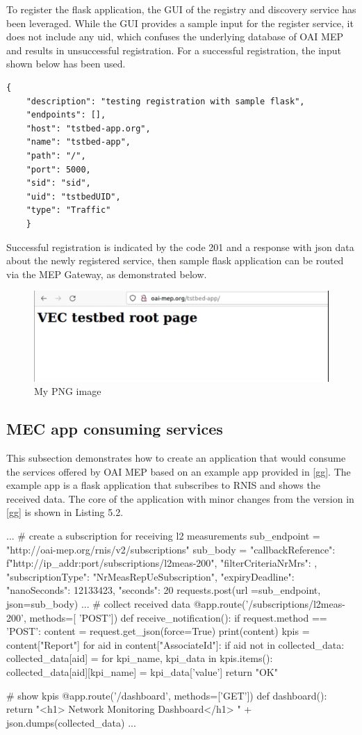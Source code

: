\documentclass[12pt,a4paper,twoside]{report}
\begin{document}
To register the flask application, the GUI of the registry and discovery service has been leveraged. While the GUI provides a sample input for the register service, it does not include any uid, which confuses the underlying database of OAI MEP and results in unsuccessful registration. For a successful registration, the input shown below has been used.
\begin{verbatim}
{
	"description": "testing registration with sample flask",
	"endpoints": [],
	"host": "tstbed-app.org",
	"name": "tstbed-app",
	"path": "/",
	"port": 5000,
	"sid": "sid",
	"uid": "tstbedUID",
	"type": "Traffic"
	}
\end{verbatim}
Successful registration is indicated by the code 201 and a response with json data about the newly registered service, then sample flask application can be routed via the MEP Gateway, as demonstrated below.
\begin{figure}[!ht]
	\centering
	\includegraphics[width=13cm]{./images/flask-demo.png} 
	\caption{My PNG image}
\end{figure}
\subsection{MEC app consuming services}
This subsection demonstrates how to create an application that would consume the services offered by OAI MEP based on an example app provided in [gg]. The example app is a flask application that subscribes to RNIS and shows the received data. The core of the application with minor changes from the version in [gg] is shown in Listing 5.2.
\begin{flask}[caption={example-app.py}]
	...
	# create a subscription for receiving l2 measurements
	sub_endpoint = "http://oai-mep.org/rnis/v2/subscriptions"
	sub_body ={
	"callbackReference": f"http://{ip_addr}:{port}/subscriptions/l2meas-200",
	"filterCriteriaNrMrs": {},
	"subscriptionType": "NrMeasRepUeSubscription",
	"expiryDeadline": {
		"nanoSeconds": 12133423,
		"seconds": 20
	}
	}
	requests.post(url =sub_endpoint, json=sub_body)
	...
	# collect received data
	@app.route('/subscriptions/l2meas-200', methods=[ 'POST'])
	def receive_notification():
		if request.method == 'POST':
			content = request.get_json(force=True)
			print(content)
			kpis = content["Report"]
			for aid in content["AssociateId"]:
				if aid not in collected_data:
					collected_data[aid] = {}
				for kpi_name, kpi_data in kpis.items():
					collected_data[aid][kpi_name] = kpi_data['value']
		return "OK"

	# show kpis
	@app.route('/dashboard', methods=['GET'])
	def dashboard():
		return "<h1> Network Monitoring Dashboard</h1> " + json.dumps(collected_data)
	...
\end{flask}
\end{document}
